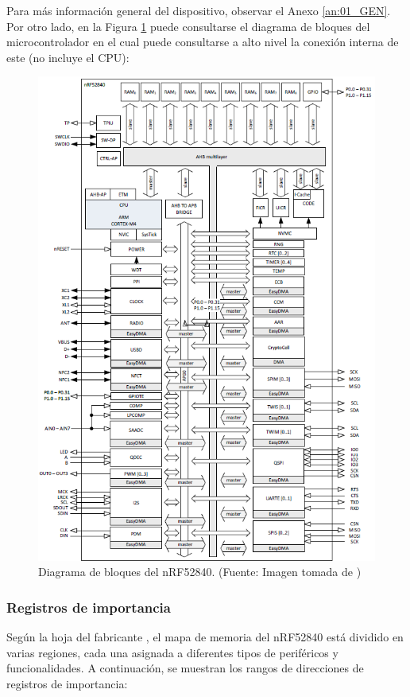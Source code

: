 Para más información general del dispositivo, observar el Anexo \ref{an:01_GEN}. Por otro lado, en la Figura \ref{fig:DBLO} puede consultarse el diagrama de bloques del microcontrolador en el cual puede consultarse a alto nivel la conexión interna de este (no incluye el CPU):

\begin{figure}[H]
\centering
\includegraphics[width=160mm]{./Figuras/Nota_teorica/DIAGRAMA_BLOQUES}
\caption{Diagrama de bloques del nRF52840. (Fuente: Imagen tomada de \cite{ST})}
\label{fig:DBLO}
\end{figure}



\subsubsection{Registros de importancia}
Según la hoja del fabricante \cite{ST}, el mapa de memoria del nRF52840 está dividido en varias regiones, cada una asignada a diferentes tipos de periféricos y funcionalidades. A continuación, se muestran los rangos de direcciones de registros de importancia:

